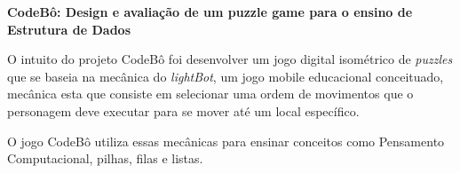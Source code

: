 \item \textbf{CodeBô: Design e avaliação de um puzzle game para o ensino de Estrutura de Dados}

O intuito do projeto CodeBô \cite{de2025codebo} foi desenvolver um jogo digital
isométrico de \emph{puzzles} que se baseia na mecânica do \emph{lightBot}, um
jogo mobile educacional conceituado, mecânica esta que consiste em selecionar
uma ordem de movimentos que o personagem deve executar para se mover até um
local específico.

O jogo CodeBô utiliza essas mecânicas para
ensinar conceitos como Pensamento Computacional, pilhas, filas e listas.
\cite{de2025codebo}


